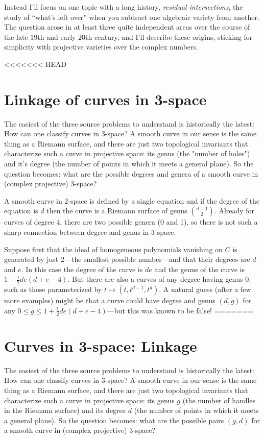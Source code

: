 \documentclass[11pt, oneside]{article}   	%
\begin{document}
Instead I'll focus on one topic with a long history, \emph{residual intersections}, the study of ``what's left over'' when you subtract one algebraic variety from another. The question arose in at least three quite independent areas over the course of the late 19th and early 20th century, and I'll describe these origins, sticking for simplicity with projective varieties over the complex numbers.

<<<<<<< HEAD
\section{Linkage of curves in 3-space} The easiest of the three source problems to understand is historically the latest: How can one classify curves in 3-space? A smooth curve in our sense is the same thing as a Riemann surface, and there are just two topological invariants that characterize such a curve in projective space: its genus (the "number of holes") and it's degree (the number of points in which it meets a general plane). So the question becomes: what are the possible degrees and genera
of a smooth curve in (complex projective) 3-space?

A  smooth curve in 2-space is defined by a single equation and if the degree of the equation is $d$ then the curve is a Riemann surface of genus $d-1\choose 2$.
Already for curves of degree 4, there are two possible genera (0 and 1), so there is not such a 
sharp connection between degree and genus in 3-space.

Suppose first that the ideal of homogeneous polynomials vanishing on $C$ is generated by just 2---the smallest possible number---and that their degrees are $d$ and $e$. In this case the degree of the curve
is $de$ and the genus of the curve is $1+\frac{1}{2}de(d+e-4)$. But there are also a curves of any degree having genus 0, such as those parameterized by $t \mapsto (t, t^{d-1}, t^{d})$. A natural guess (after a few more examples) might be that a curve could have degree and genus $(d,g)$ for any
$0\leq g \leq 1+\frac{1}{2}de(d+e-4)$---but this was known to be false!
=======
\section{Curves in 3-space: Linkage} The easiest of the three source problems to understand is historically the latest: How can one classify curves in 3-space? A smooth curve in our sense is the same thing as a Riemann surface, and there are just two topological invariants that characterize such a curve in projective space: its genus $g$ (the number of handles in the Riemann surface) and its degree $d$ (the number of points in which it meets a general plane). So the question becomes: what are the possible pairs $(g,d)$ for a smooth curve in (complex projective) 3-space?
\end{document}
